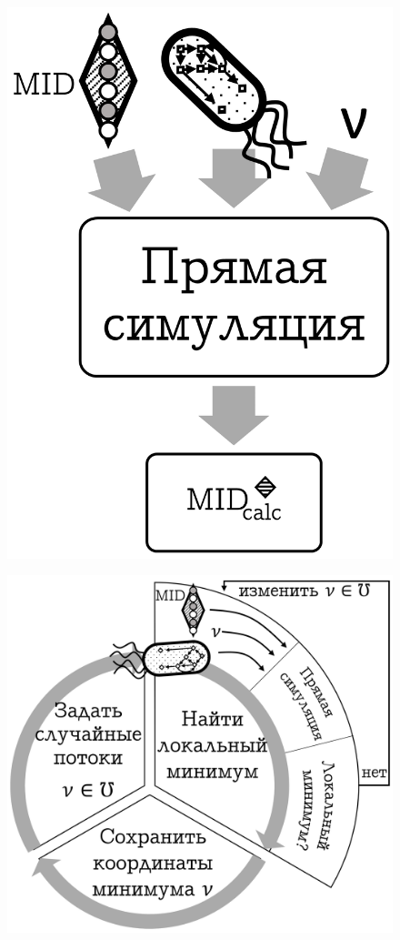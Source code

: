 \documentclass[14pt, a4paper]{extreport}
\begin{document}
\begin{figure}[t]
	\centering
	\begin{minipage}[l]{.4\textwidth}
		\centering
		\includegraphics[width=1\linewidth]{direct_simulation.png}
		\label{direct_simulation}
	\end{minipage}%
	\begin{minipage}[r]{.6\textwidth}
		\centering
		\includegraphics[width=1\linewidth]{inverse_problem.png}

\end{minipage}
\end{figure}
\end{document}
